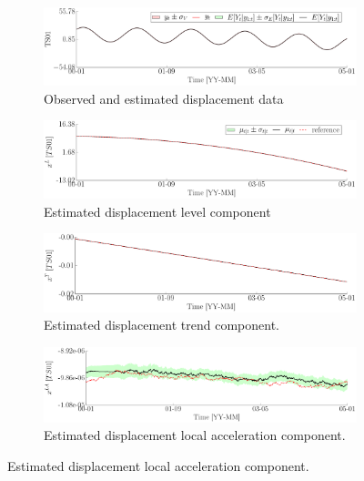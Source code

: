 \begin{figure}[h!]
\centering
\begin{subfigure}{\linewidth}
\includegraphics[width=0.9\linewidth]{./docfigs/Example_SYNTHETIC/optim_param_optim_initialhiddenstate/TS01_ObservedPredicted.pdf}
\caption{Observed and estimated displacement data}
\end{subfigure}
\begin{subfigure}{\linewidth}
\includegraphics[width=0.9\linewidth]{./docfigs/Example_SYNTHETIC/optim_param_optim_initialhiddenstate/TS01_LL_1.pdf} 
\caption{Estimated displacement level component}
\end{subfigure}
\begin{subfigure}{\linewidth}
\includegraphics[width=0.9\linewidth]{./docfigs/Example_SYNTHETIC/optim_param_optim_initialhiddenstate/TS01_LT_2.pdf}
\caption{Estimated displacement trend component.}
\end{subfigure}
\begin{subfigure}{\linewidth}
\includegraphics[width=0.9\linewidth]{./docfigs/Example_SYNTHETIC/optim_param_optim_initialhiddenstate/TS01_LA_3.pdf}
\caption{Estimated displacement local acceleration component.}
\end{subfigure}
\end{figure}
